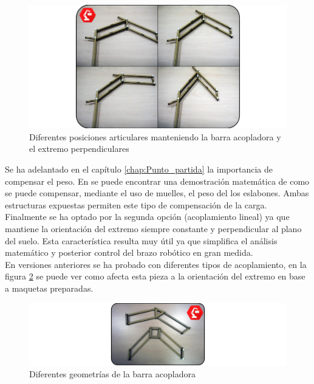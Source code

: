     
    \begin{figure}[H]
       	\centering
       	\includegraphics[width=\textwidth]{figuras/Imagenes_Mecanica/movimiento_maqueta.jpg}
       	\caption{Diferentes posiciones articulares manteniendo la barra acopladora y el extremo perpendiculares}
       	\label{fig:Mecanica:movimiento}
    \end{figure}

    Se ha adelantado en el capítulo \ref{chap:Punto_partida} la importancia de compensar el peso. En \cite{Rahman_asimple} se puede encontrar una demostración matemática de como se puede compensar, mediante el uso de muelles, el peso del los eslabones. Ambas estructuras expuestas permiten este tipo de compensación de la carga. Finalmente se ha optado por la segunda opción (acoplamiento lineal) ya que mantiene la orientación del extremo siempre constante y perpendicular al plano del suelo. Esta característica resulta muy útil ya que simplifica el análisis matemático y posterior control del brazo robótico en gran medida.
    \\
    
    En versiones anteriores se ha probado con diferentes tipos de acoplamiento, en la figura \ref{fig:Mecanica:geometria_acopladora} se puede ver como afecta esta pieza a la orientación del extremo en base a maquetas preparadas.
    
    \begin{figure}[H]
    	\centering
    	\includegraphics[width=\textwidth]{figuras/Imagenes_Mecanica/transicion_maqueta.jpg}
    	\caption{Diferentes geometrías de la barra acopladora}
    	\label{fig:Mecanica:geometria_acopladora}
    \end{figure}

